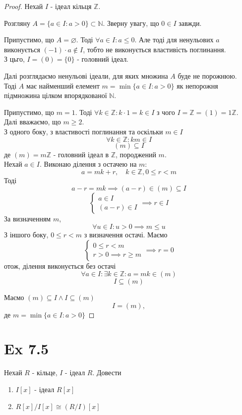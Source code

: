 \documentclass[11pt, a4paper]{article} %
\newcommand{\N}{\mathbb{N}}
\newcommand{\Z}{\mathbb{Z}}
\begin{document}
\begin{proof}
    Нехай $I$ - ідеал кільця $\Z$.

    Розгляну $A = \{a \in I : a > 0\} \subset \N$. Зверну увагу, що $0\in I$ завжди.

    Припустимо, що $A = \varnothing$. Тоді $\forall a \in I: a \le 0$. 
    Але тоді для ненульових $a$ виконується $(-1) \cdot a \notin I$, тобто не виконується властивість поглинання. \\
    З цьго, $I = (0) = \{0\}$ - головний ідеал.

    Далі розглядаємо ненульові ідеали, для яких множина $A$ буде не порожнюю.\\
    Тоді $A$ має найменший елемент $m = \min \{a \in I: a>0\}$ як непорожня підмножина цілком впорядкованої $\N$.

    Припустимо, що $m=1$. Тоді $\forall k \in \Z: k\cdot 1 = k \in I$ з чого $I = \Z = (1) = 1\Z$.\\
    Далі вважаємо, що $m\ge 2$.\\

    З одного боку, з властивості поглинання та оскільки $m \in I$ 
    \[\forall k \in \Z: km \in I\]
    \[(m) \subseteq I\]
    де $(m)=m\Z$ - головний ідеал в $\Z$, породжений $m$.\\

    Нехай $a \in I$. Виконаю ділення з остачею на $m$:
    \[a = mk + r, \quad k\in\Z, 0\le r < m\]
    Тоді
    \[a-r = mk \implies (a-r) \in (m) \subseteq I\]
    \[\begin{cases}
        a \in I\\
        (a-r) \in I
    \end{cases} \implies r \in I\]
    За визначенням $m$,
    \[\forall u \in I: u>0 \implies m \le u\]
    З іншого боку, $0 \le r < m$ з визначення остачі.
    Маємо
    \[\begin{cases}
        0 \le r < m\\
        r>0 \implies r \ge m
    \end{cases} \implies r=0\]
    отож, ділення виконується без остачі
    \[\forall a\in I: \exists k\in\Z: a = mk \in (m)\]
    \[I \subseteq (m)\]

    Маємо $(m) \subseteq I \land I \subseteq (m)$
    \[I = (m),\]
    де $m = \min \{a \in I: a>0\}$
\end{proof}

\newpage
\section*{Ex 7.5}
\begin{mdframed}
    Нехай $R$ - кільце, $I$ - ідеал $R$.
    Довести
    \begin{enumerate}
        \item $I[x]$ - ідеал $R[x]$
        \item $R[x]/I[x] \cong (R/I)[x]$
    \end{enumerate}
\end{mdframed}
\end{document}
